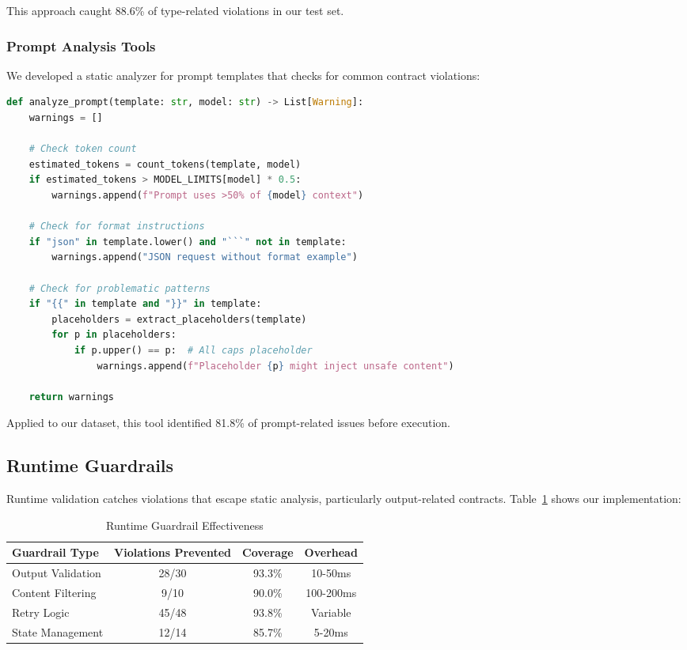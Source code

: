 \documentclass[11pt]{article}
\begin{document}
This approach caught 88.6\% of type-related violations in our test set.

\subsubsection{Prompt Analysis Tools}

We developed a static analyzer for prompt templates that checks for common contract violations:

\begin{lstlisting}[language=Python, caption={Static prompt analyzer}]
def analyze_prompt(template: str, model: str) -> List[Warning]:
    warnings = []
    
    # Check token count
    estimated_tokens = count_tokens(template, model)
    if estimated_tokens > MODEL_LIMITS[model] * 0.5:
        warnings.append(f"Prompt uses >50% of {model} context")
    
    # Check for format instructions
    if "json" in template.lower() and "```" not in template:
        warnings.append("JSON request without format example")
    
    # Check for problematic patterns
    if "{{" in template and "}}" in template:
        placeholders = extract_placeholders(template)
        for p in placeholders:
            if p.upper() == p:  # All caps placeholder
                warnings.append(f"Placeholder {p} might inject unsafe content")
    
    return warnings
\end{lstlisting}

Applied to our dataset, this tool identified 81.8\% of prompt-related issues before execution.

\subsection{Runtime Guardrails}

Runtime validation catches violations that escape static analysis, particularly output-related contracts. Table~\ref{tab:runtime_guardrails} shows our implementation:

\begin{table}[h]
\centering
\caption{Runtime Guardrail Effectiveness}
\label{tab:runtime_guardrails}
\begin{tabular}{lccc}
\toprule
\textbf{Guardrail Type} & \textbf{Violations Prevented} & \textbf{Coverage} & \textbf{Overhead} \\
\midrule
Output Validation & 28/30 & 93.3\% & 10-50ms \\
Content Filtering & 9/10 & 90.0\% & 100-200ms \\
Retry Logic & 45/48 & 93.8\% & Variable \\
State Management & 12/14 & 85.7\% & 5-20ms \\
\bottomrule
\end{tabular}
\end{table}
\end{document}
